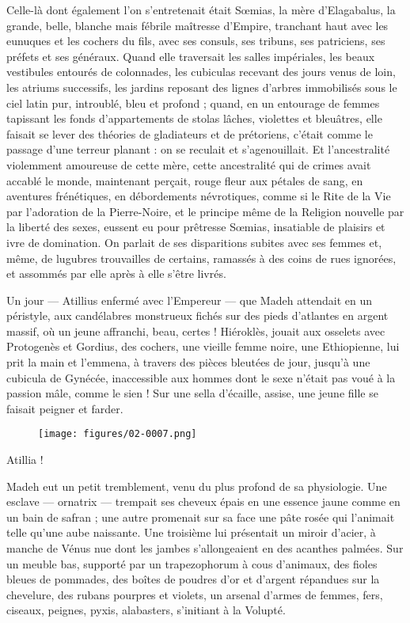 \documentclass[a4paper, 11pt, oneside, polutonikogreek, french]{article}
\begin{document}
Celle-là dont également l'on s'entretenait était Sœmias, la mère d'Elagabalus, la grande, belle, blanche mais fébrile maîtresse d'Empire, tranchant haut avec les eunuques et les cochers du fils, avec ses consuls, ses tribuns, ses patriciens, ses préfets et ses généraux. Quand elle traversait les salles impériales, les beaux vestibules entourés de colonnades, les cubiculas recevant des jours venus de loin, les atriums successifs, les jardins reposant des lignes d'arbres immobilisés sous le ciel latin pur, introublé, bleu et profond ; quand, en un entourage de femmes tapissant les fonds d'appartements de stolas lâches, violettes et bleuâtres, elle faisait se lever des théories de gladiateurs et de prétoriens, c'était comme le passage d'une terreur planant : on se reculait et s'agenouillait. Et l'ancestralité violemment amoureuse de cette mère, cette ancestralité qui de crimes avait accablé le monde, maintenant perçait, rouge fleur aux pétales de sang, en aventures frénétiques, en débordements névrotiques, comme si le Rite de la Vie par l'adoration de la Pierre-Noire, et le principe même de la Religion nouvelle par la liberté des sexes, eussent eu pour prêtresse Sœmias, insatiable de plaisirs et ivre de domination. On parlait de ses disparitions subites avec ses femmes et, même, de lugubres trouvailles de certains, ramassés à des coins de rues ignorées, et assommés par elle après à elle s'être livrés.

Un jour --- Atillius enfermé avec l'Empereur --- que Madeh attendait en un péristyle, aux candélabres monstrueux fichés sur des pieds d'atlantes en argent massif, où un jeune affranchi, beau, certes ! Hiéroklès, jouait aux osselets avec Protogenès et Gordius, des cochers, une vieille femme noire, une Ethiopienne, lui prit la main et l'emmena, à travers des pièces bleutées de jour, jusqu'à une cubicula de Gynécée, inaccessible aux hommes dont le sexe n'était pas voué à la passion mâle, comme le sien ! Sur une sella d'écaille, assise, une jeune fille se faisait peigner et farder.
\begin{figure}[H]
\centering
\texttt{[image: figures/02-0007.png]}
\end{figure}
Atillia !

Madeh eut un petit tremblement, venu du plus profond de sa physiologie. Une esclave --- ornatrix --- trempait ses cheveux épais en une essence jaune comme en un bain de safran ; une autre promenait sur sa face une pâte rosée qui l'animait telle qu'une aube naissante. Une troisième lui présentait un miroir d'acier, à manche de Vénus nue dont les jambes s'allongeaient en des acanthes palmées. Sur un meuble bas, supporté par un trapezophorum à cous d'animaux, des fioles bleues de pommades, des boîtes de poudres d'or et d'argent répandues sur la chevelure, des rubans pourpres et violets, un arsenal d'armes de femmes, fers, ciseaux, peignes, pyxis, alabasters, s'initiant à la Volupté.
\end{document}
